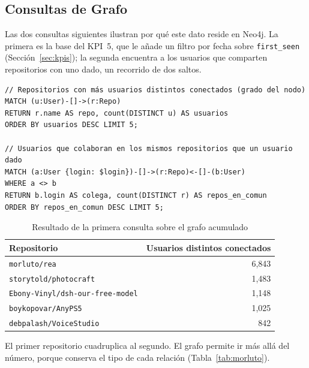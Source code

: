 \subsection{Consultas de Grafo}

Las dos consultas siguientes ilustran por qué este dato reside en Neo4j. La primera es la base del KPI~5, que le añade un filtro por fecha sobre \texttt{first\_seen} (Sección~\ref{sec:kpis}); la segunda encuentra a los usuarios que comparten repositorios con uno dado, un recorrido de dos saltos.

\begin{lstlisting}[style=plano]
// Repositorios con más usuarios distintos conectados (grado del nodo)
MATCH (u:User)-[]->(r:Repo)
RETURN r.name AS repo, count(DISTINCT u) AS usuarios
ORDER BY usuarios DESC LIMIT 5;

// Usuarios que colaboran en los mismos repositorios que un usuario dado
MATCH (a:User {login: $login})-[]->(r:Repo)<-[]-(b:User)
WHERE a <> b
RETURN b.login AS colega, count(DISTINCT r) AS repos_en_comun
ORDER BY repos_en_comun DESC LIMIT 5;
\end{lstlisting}

\begin{table}[H]
\centering
\caption{Resultado de la primera consulta sobre el grafo acumulado}
\label{tab:top-repos}
\vspace{0.2cm}
\small
\begin{tabular}{@{}lr@{}}
\toprule
\textbf{Repositorio} & \textbf{Usuarios distintos conectados} \\
\midrule
\texttt{morluto/rea}                     & 6,843 \\
\texttt{storytold/photocraft}            & 1,483 \\
\texttt{Ebony-Vinyl/dsh-our-free-model}  & 1,148 \\
\texttt{boykopovar/AnyPS5}               & 1,025 \\
\texttt{debpalash/VoiceStudio}           &   842 \\
\bottomrule
\end{tabular}
\end{table}

El primer repositorio cuadruplica al segundo. El grafo permite ir más allá del número, porque conserva el tipo de cada relación (Tabla~\ref{tab:morluto}).

